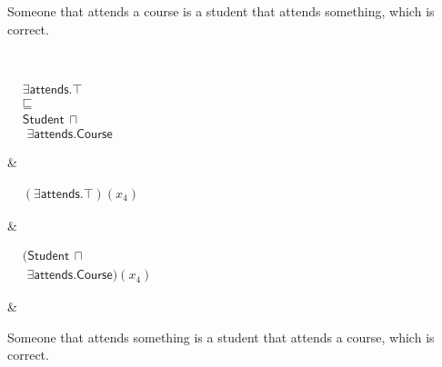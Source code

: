 \documentclass{amsart}
\newcommand\tableEntailmentSpacing{2.5cm}
\newcommand\tableExamplarSpacing{3.5cm}
\newcommand\tableCommentSpacing{4cm}
\newcommand\tableEquationIndent{4pt}
\begin{document}
\begin{table}
\begin{center}
\begin{tabular}
\begin{minipage}{\tableCommentSpacing}
				Someone that attends a course is a student that attends something, which is correct.
				\vspace{2pt}
			\end{minipage}     
			\\
			\begin{minipage}{\tableEntailmentSpacing}
				\vspace{2pt}
				$\begin{aligned}
				&\exists \mathsf{attends}.\top\\
				&\sqsubseteq\\
				&\mathsf{Student}\hspace{2pt} \sqcap \\
				&\hspace{\tableEquationIndent}\exists \mathsf{attends}.\mathsf{Course}
				\end{aligned}$
			\end{minipage}
			&
			\begin{minipage}{\tableExamplarSpacing}
				$\begin{aligned}
				&(\exists \mathsf{attends}.\top)(x_4)
				\end{aligned}$
			\end{minipage}
			&
			\begin{minipage}{\tableExamplarSpacing}
				\vspace{2pt}
				$\begin{aligned}
				&(\mathsf{Student}\hspace{2pt} \sqcap \\
				&\hspace{\tableEquationIndent}\exists \mathsf{attends}.\mathsf{Course})(x_4)
				\end{aligned}$ 
			\end{minipage}
			&
			\begin{minipage}{\tableCommentSpacing}
				\vspace{2pt}
				Someone that attends something is a student that attends a course, which is correct.
				\vspace{2pt}
			\end{minipage}     
			\\
			
			\hline
		\end{tabular}
	\end{center}
	\normalsize
\end{table}
 
\end{document}
